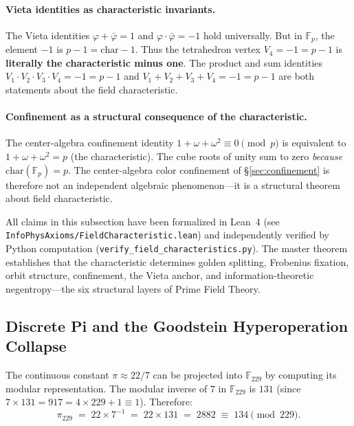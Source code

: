 \paragraph{Vieta identities as characteristic invariants.}
The Vieta identities $\varphi + \bar\varphi = 1$ and $\varphi \cdot \bar\varphi = -1$ hold universally. But in $\mathbb{F}_p$, the element $-1$ is $p - 1 = \mathrm{char} - 1$. Thus the tetrahedron vertex $V_4 = -1 = p - 1$ is \textbf{literally the characteristic minus one}. The product and sum identities $V_1 \cdot V_2 \cdot V_3 \cdot V_4 = -1 = p - 1$ and $V_1 + V_2 + V_3 + V_4 = -1 = p - 1$ are both statements about the field characteristic.

\paragraph{Confinement as a structural consequence of the characteristic.}
The center-algebra confinement identity $1 + \omega + \omega^2 \equiv 0 \pmod{p}$ is equivalent to $1 + \omega + \omega^2 = p$ (the characteristic). The cube roots of unity sum to zero \emph{because} $\mathrm{char}(\mathbb{F}_p) = p$. The center-algebra color confinement of \S\ref{sec:confinement} is therefore not an independent algebraic phenomenon---it is a structural theorem about field characteristic.

\begin{remark}
All claims in this subsection have been formalized in Lean~4 (see \texttt{InfoPhysAxioms/FieldCharacteristic.lean}) and independently verified by Python computation (\texttt{verify\_field\_characteristics.py}). The master theorem establishes that the characteristic determines golden splitting, Frobenius fixation, orbit structure, confinement, the Vieta anchor, and information-theoretic negentropy---the six structural layers of Prime Field Theory.
\end{remark}

\subsection{Discrete Pi and the Goodstein Hyperoperation Collapse}
\label{sec:pi_hyperops}

The continuous constant $\pi \approx 22/7$ can be projected into $\mathbb{F}_{229}$ by computing its modular representation. The modular inverse of $7$ in $\mathbb{F}_{229}$ is $131$ (since $7 \times 131 = 917 = 4 \times 229 + 1 \equiv 1$). Therefore:
\[
\pi_{229} \;=\; 22 \times 7^{-1} \;=\; 22 \times 131 \;=\; 2882 \;\equiv\; 134 \pmod{229}.
\]

